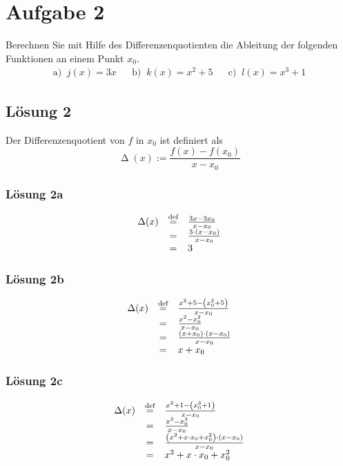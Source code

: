 \documentclass[main.tex]{subfiles}
\begin{document}
\section{Aufgabe 2}
Berechnen Sie mit Hilfe des Differenzenquotienten die Ableitung der folgenden Funktionen an einem Punkt $x_0$.
\begin{align*}
    \text{a) }\ j(x) = 3x & &
    \text{b) }\ k(x) = x^2+5 & &
    \text{c) }\ l(x) = x^3 +1
\end{align*}

\subsection*{Lösung 2}

Der Differenzenquotient von $f$ in $x_{0}$ ist definiert als
\begin{equation*}
    \upDelta ( x) :=\frac{f( x) -f( x_{0})}{x-x_{0}}
\end{equation*}


\subsubsection*{Lösung 2a}
\begin{equation*}
    \begin{array}{ c c l }
    \Delta ( x) & \stackrel{\text{def}}{=}  & \frac{3x-3x_{0}}{x-x_{0}}\\
    & = & \frac{3\cdot ( x-x_{0})}{x-x_{0}}\\
    & = & 3
    \end{array}
\end{equation*}


\subsubsection*{Lösung 2b}
\begin{equation*}
    \begin{array}{ c c l }
    \Delta ( x) & \stackrel{\text{def}}{=}  & \frac{x^{2} +5-\left( x_{0}^{2} +5\right)}{x-x_{0}}\\
    & = & \frac{x^{2} -x_{0}^{2}}{x-x_{0}}\\
    & = & \frac{( x+x_{0}) \cdot ( x-x_{0})}{x-x_{0}}\\
    & = & x+x_{0}
    \end{array}
\end{equation*}

\subsubsection*{Lösung 2c}
\begin{equation*}
    \begin{array}{ c c l }
    \Delta ( x) & \stackrel{\text{def}}{=}  & \frac{x^{3} +1-\left( x_{0}^{3} +1\right)}{x-x_{0}}\\
     & = & \frac{x^{3} -x_{0}^{3}}{x-x_{0}}\\
     & = & \frac{\left( x^{2} +x\cdot x_{0} +x_{0}^{2}\right) \cdot ( x-x_{0})}{x-x_{0}}\\
     & = & x^{2} +x\cdot x_{0} +x_{0}^{2}
    \end{array}
\end{equation*}
\end{document}
